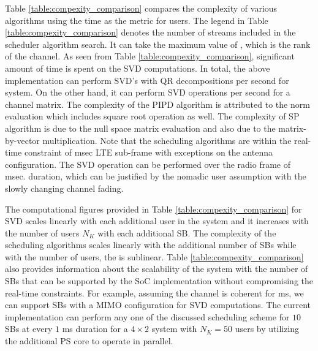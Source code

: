 \documentclass[conference,letterpaper,10pt]{./../../IEEE/IEEEtran}
\begin{document}
Table \ref{table:compexity_comparison} compares the complexity of various algorithms using the time as the metric for  users. The legend \me{\lambda} in Table \ref{table:compexity_comparison} denotes the number of streams included in the scheduler algorithm search. It can take the maximum value of \me{\kappa}, which is the rank of the channel. As seen from Table \ref{table:compexity_comparison}, significant amount of time is spent on the SVD computations. In total, the above implementation can perform  SVD's with  QR decompositions per second for  system. On the other hand, it can perform  SVD operations per second for a  channel matrix. The complexity of the PIPD algorithm is attributed to the norm evaluation which includes square root operation as well. The complexity of SP algorithm is due to the null space matrix evaluation and also due to the matrix-by-vector multiplication. Note that the scheduling algorithms are within the real-time constraint of  msec LTE sub-frame with exceptions on the  antenna configuration. The SVD operation can be performed over the radio frame of  msec. duration, which can be justified by the nomadic user assumption with the slowly changing channel fading.

The computational figures provided in Table \ref{table:compexity_comparison} for SVD scales linearly with each additional user in the system and it increases with the number of users $N_K$ with each additional SB. The complexity of the scheduling algorithms scales linearly with the additional number of SBs while with the number of users, the  is sublinear. Table \ref{table:compexity_comparison} also provides information about the scalability of the system with the number of SBs that can be supported by the \ac{SoC} implementation without compromising the real-time constraints. For example, assuming the channel is coherent for  ms, we can support  SBs with a  MIMO configuration for SVD computations. The current implementation can perform any one of the discussed scheduling scheme for $10$ SBs at every $1$ ms duration for a $4 \times 2$ system with $N_K = 50$ users by utilizing the additional PS core to operate in parallel.

\acresetall {}
\end{document}
